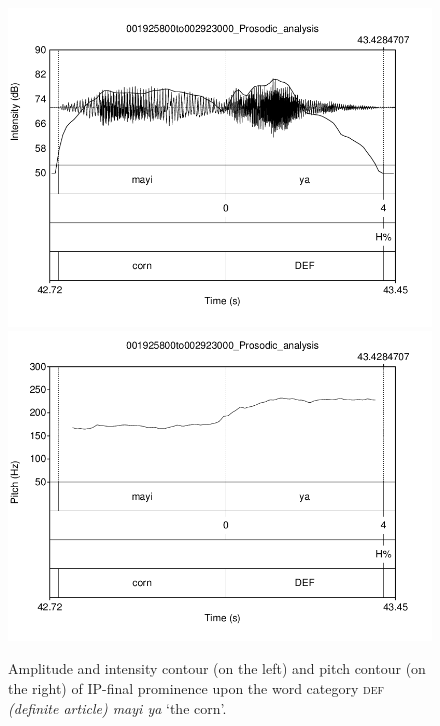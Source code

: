 \documentclass[output=paper]{langsci/langscibook}
\begin{document}
\begin{figure}  
\includegraphics[width=\textwidth]{figures/KALPeerreviewedkorr-img8.png}   
\includegraphics[width=\textwidth]{figures/KALPeerreviewedkorr-img9.png}
 
\caption{\label{fig:kal:6} Amplitude and intensity contour (on the left) and pitch contour (on the right) of IP-final prominence upon the word category \textsc{def} \textit{(definite article) mayi ya} ‘the corn’.}
\end{figure}
\end{document}
